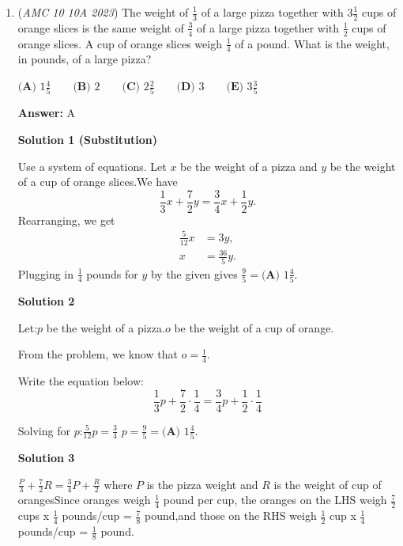 \begin{enumerate}
 Therefore, the answer is $\boxed{\textbf{(E)}\ 27}$.

 


 


	\item (\textit{AMC 10 10A 2023}) The weight of $\frac{1}{3}$ of a large pizza together with $3 \frac{1}{2}$ cups of orange slices is the same weight of $\frac{3}{4}$ of a large pizza together with $\frac{1}{2}$ cups of orange slices. A cup of orange slices weigh $\frac{1}{4}$ of a pound. What is the weight, in pounds, of a large pizza?


 $\textbf{(A) }1\frac{4}{5}\qquad\textbf{(B) }2\qquad\textbf{(C) }2\frac{2}{5}\qquad\textbf{(D) }3\qquad\textbf{(E) }3\frac{3}{5}$

 \textbf{Answer: }A



\textbf{Solution 1 (Substitution)}

Use a system of equations. Let $x$ be the weight of a pizza and $y$ be the weight of a cup of orange slices.We have 
 \[\frac{1}{3}x+\frac{7}{2}y=\frac{3}{4}x+\frac{1}{2}y.\]Rearranging, we get 
 \begin{align*} \frac{5}{12}x&=3y, \\ x&=\frac{36}{5}y. \end{align*}
Plugging in $\frac{1}{4}$ pounds for $y$ by the given gives $\frac{9}{5}=\boxed{\textbf{(A) }1\frac{4}{5}}.$




\textbf{Solution 2}

Let:$p$ be the weight of a pizza.$o$ be the weight of a cup of orange.

 From the problem, we know that $o = \frac{1}{4}$.

 Write the equation below:
 \[\frac{1}{3} p + \frac{7}{2}\cdot\frac{1}{4} = \frac{3}{4} p + \frac{1}{2}\cdot\frac{1}{4}\]

 Solving for $p$:$\frac{5}{12} p = \frac{3}{4}$
$p = \frac{9}{5} = \boxed{\textbf{(A) }1\frac{4}{5}}.$




\textbf{Solution 3}

$\frac{P}{3} + \frac{7}{2} R = \frac{3}{4} P + \frac{R}{2}$ where $P$ is the pizza weight and $R$ is the weight of cup of orangesSince oranges weigh $\frac{1}{4}$ pound per cup, the oranges on the LHS weigh $\frac{7}{2}$ cups x $\frac{1}{4}$ pounds/cup = $\frac{7}{8}$ pound,and those on the RHS weigh $\frac{1}{2}$ cup x $\frac{1}{4}$ pounds/cup = $\frac{1}{8}$ pound.


\end{enumerate}
